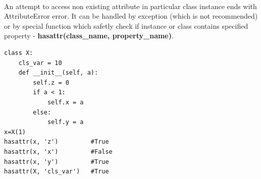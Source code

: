 \documentclass{article}
\begin{document}
\paragraph{}
An attempt to access non existing attribute in particular class instance ends with \textcolor{pythonerror}{AttributeError} error. It can be handled by exception (which is not recommended) or by special function which safetly check if instance or class contains specified property - \textbf{hasattr(class\_name, property\_name)}. 
\begin{lstlisting}[style=pystyle]
class X:
	cls_var = 10
    def __init__(self, a):
        self.z = 0
        if a < 1:
            self.x = a
        else:
            self.y = a
x=X(1)
hasattr(x, 'z')			#True
hasattr(x, 'x')			#False
hasattr(x, 'y')			#True
hasattr(X, 'cls_var')	#True
\end{lstlisting}
\end{document}
